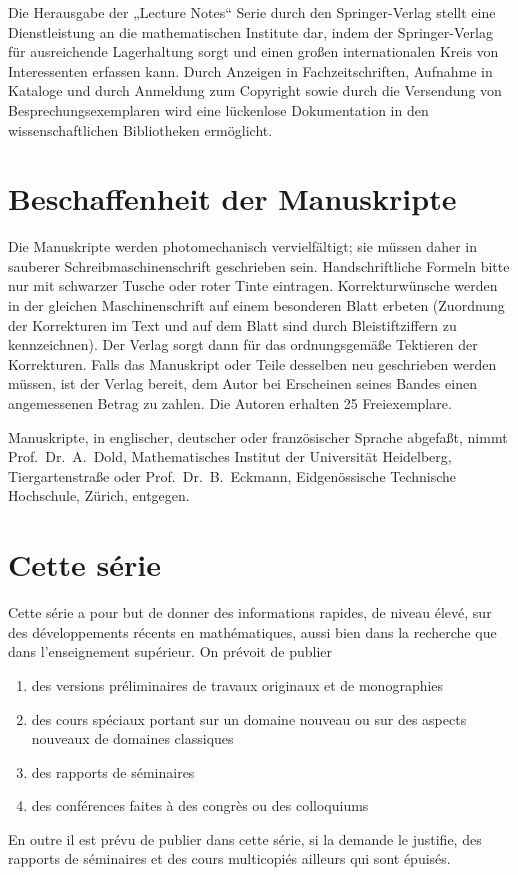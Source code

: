 \medskip
Die Herausgabe der „Lecture Notes“ Serie durch den Springer-Verlag stellt eine Dienstleistung an die mathematischen Institute dar, indem der Springer-Verlag f\"ur ausreichende Lagerhaltung sorgt und einen gro\ss{}en internationalen Kreis von Interessenten erfassen kann. Durch Anzeigen in Fachzeitschriften, Aufnahme in Kataloge und durch Anmeldung zum Copyright sowie durch die Versendung von Besprechungsexemplaren wird eine l\"uckenlose Dokumentation in den wissenschaftlichen Bibliotheken erm\"oglicht.

\section*{Beschaffenheit der Manuskripte}
Die Manuskripte werden photomechanisch vervielf\"altigt; sie m\"ussen daher in sauberer Schreibmaschinenschrift geschrieben sein. Handschriftliche Formeln bitte nur mit schwarzer Tusche oder roter Tinte eintragen. Korrekturw\"unsche werden in der gleichen Maschinenschrift auf einem besonderen Blatt erbeten (Zuordnung der Korrekturen im Text und auf dem Blatt sind durch Bleistiftziffern zu kennzeichnen). Der Verlag sorgt dann f\"ur das ordnungsgem\"a\ss{}e Tektieren der Korrekturen. Falls das Manuskript oder Teile desselben neu geschrieben werden m\"ussen, ist der Verlag bereit, dem Autor bei Erscheinen seines Bandes einen angemessenen Betrag zu zahlen. Die Autoren erhalten 25 Freiexemplare.

\medskip
Manuskripte, in englischer, deutscher oder franz\"osischer Sprache abgefa\ss{}t, nimmt Prof.\ Dr.\ A.\ Dold, Mathematisches Institut der Universit\"at Heidelberg, Tiergartenstra\ss{}e oder Prof.\ Dr.\ B.\ Eckmann, Eidgen\"ossische Technische Hochschule, Z\"urich, entgegen.

\section*{\texorpdfstring{Cette s\'erie}{Cette serie}}
\setlength{\emergencystretch}{3em}
Cette s\'erie a pour but de donner des informations rapides, de niveau \'elev\'e, sur des d\'eveloppements r\'ecents en math\'ematiques, aussi bien dans la recherche que dans l'enseignement sup\'erieur. On pr\'evoit de publier
\begin{enumerate}[leftmargin=2.5em]
\item des versions pr\'eliminaires de travaux originaux et de monographies
\item des cours sp\'eciaux portant sur un domaine nouveau ou sur des aspects nouveaux de domaines classiques
\item des rapports de s\'eminaires
\item des conf\'erences faites \`a des congr\`es ou des colloquiums
\end{enumerate}
En outre il est pr\'evu de publier dans cette s\'erie, si la demande le justifie, des rapports de s\'eminaires et des cours multicopi\'es ailleurs qui sont \'epuis\'es.

